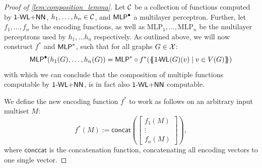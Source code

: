 \begin{proof}[Proof of \cref{lem:composition_lemma}]
    Let $\mathcal{C}$ be a collection of functions computed by $\textsf{1-WL+NN}$, $h_1, \dots ,h_n \in \mathcal{C}$, and $\textsf{MLP}^\bullet$ a multilayer perceptron. Further, let $f_{1}, \ldots, f_{n}$ be the encoding functions, as well as $\text{MLP}_1, \ldots, \text{MLP}_n$ be the multilayer perceptrons used by $h_1, \dots h_n$ respectively. As outlined above, we will now construct $f^*$ and $\textsf{MLP}^*$, such that for all graphs $G \in \mathcal{X}$:
    \begin{equation*}
        \textsf{MLP}^\bullet(h_1(G), \dots ,h_n(G)) = \textsf{MLP}^* \circ f^* (\{\!\!\{ \textsf{1-\!WL}(G)(v) \mid v \in V(G) \}\!\!\})
    \end{equation*}
    with which we can conclude that the composition of multiple functions computable by $\textsf{1-WL+NN}$, is in fact also $\textsf{1-WL+NN}$ computable. 

    We define the new encoding function $f^*$ to work as follows on an arbitrary input multiset $M$:
    \begin{equation*}
        f^*(M) := \textsf{concat}(
            \begin{bmatrix}
                f_1(M)\\
                \vdots\\
                f_n(M)
            \end{bmatrix}),
    \end{equation*}
    where $\textsf{conccat}$ is the concatenation function, concatenating all encoding vectors to one single vector.


\end{proof}
